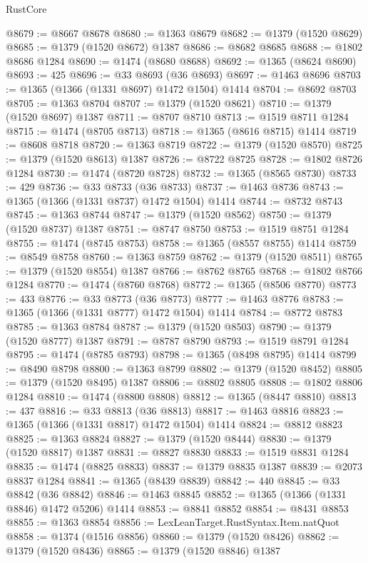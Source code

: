 \begin{lexlean}{RustCore}
\begin{coremodule}
@8679 := @8667 @8678
@8680 := @1363 @8679
@8682 := @1379 (@1520 @8629)
@8685 := @1379 (@1520 @8672) @1387
@8686 := @8682 @8685
@8688 := @1802 @8686 @1284
@8690 := @1474 (@8680 @8688)
@8692 := @1365 (@8624 @8690)
@8693 := 425
@8696 := @33 @8693 (@36 @8693)
@8697 := @1463 @8696
@8703 := @1365 (@1366 (@1331 @8697) @1472 @1504) @1414
@8704 := @8692 @8703
@8705 := @1363 @8704
@8707 := @1379 (@1520 @8621)
@8710 := @1379 (@1520 @8697) @1387
@8711 := @8707 @8710
@8713 := @1519 @8711 @1284
@8715 := @1474 (@8705 @8713)
@8718 := @1365 (@8616 @8715) @1414
@8719 := @8608 @8718
@8720 := @1363 @8719
@8722 := @1379 (@1520 @8570)
@8725 := @1379 (@1520 @8613) @1387
@8726 := @8722 @8725
@8728 := @1802 @8726 @1284
@8730 := @1474 (@8720 @8728)
@8732 := @1365 (@8565 @8730)
@8733 := 429
@8736 := @33 @8733 (@36 @8733)
@8737 := @1463 @8736
@8743 := @1365 (@1366 (@1331 @8737) @1472 @1504) @1414
@8744 := @8732 @8743
@8745 := @1363 @8744
@8747 := @1379 (@1520 @8562)
@8750 := @1379 (@1520 @8737) @1387
@8751 := @8747 @8750
@8753 := @1519 @8751 @1284
@8755 := @1474 (@8745 @8753)
@8758 := @1365 (@8557 @8755) @1414
@8759 := @8549 @8758
@8760 := @1363 @8759
@8762 := @1379 (@1520 @8511)
@8765 := @1379 (@1520 @8554) @1387
@8766 := @8762 @8765
@8768 := @1802 @8766 @1284
@8770 := @1474 (@8760 @8768)
@8772 := @1365 (@8506 @8770)
@8773 := 433
@8776 := @33 @8773 (@36 @8773)
@8777 := @1463 @8776
@8783 := @1365 (@1366 (@1331 @8777) @1472 @1504) @1414
@8784 := @8772 @8783
@8785 := @1363 @8784
@8787 := @1379 (@1520 @8503)
@8790 := @1379 (@1520 @8777) @1387
@8791 := @8787 @8790
@8793 := @1519 @8791 @1284
@8795 := @1474 (@8785 @8793)
@8798 := @1365 (@8498 @8795) @1414
@8799 := @8490 @8798
@8800 := @1363 @8799
@8802 := @1379 (@1520 @8452)
@8805 := @1379 (@1520 @8495) @1387
@8806 := @8802 @8805
@8808 := @1802 @8806 @1284
@8810 := @1474 (@8800 @8808)
@8812 := @1365 (@8447 @8810)
@8813 := 437
@8816 := @33 @8813 (@36 @8813)
@8817 := @1463 @8816
@8823 := @1365 (@1366 (@1331 @8817) @1472 @1504) @1414
@8824 := @8812 @8823
@8825 := @1363 @8824
@8827 := @1379 (@1520 @8444)
@8830 := @1379 (@1520 @8817) @1387
@8831 := @8827 @8830
@8833 := @1519 @8831 @1284
@8835 := @1474 (@8825 @8833)
@8837 := @1379 @8835 @1387
@8839 := @2073 @8837 @1284
@8841 := @1365 (@8439 @8839)
@8842 := 440
@8845 := @33 @8842 (@36 @8842)
@8846 := @1463 @8845
@8852 := @1365 (@1366 (@1331 @8846) @1472 @5206) @1414
@8853 := @8841 @8852
@8854 := @8431 @8853
@8855 := @1363 @8854
@8856 := LexLeanTarget.RustSyntax.Item.natQuot
@8858 := @1374 (@1516 @8856)
@8860 := @1379 (@1520 @8426)
@8862 := @1379 (@1520 @8436)
@8865 := @1379 (@1520 @8846) @1387

\end{coremodule}
\end{lexlean}
